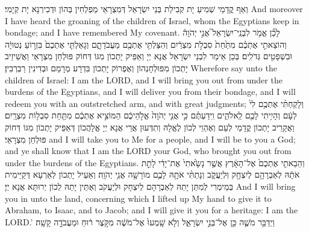 {{וְאַף קֳדָמַי שְׁמִיעַ יָת קְבִילַת בְּנֵי יִשְׂרָאֵל דְּמִצְרָאֵי מַפְלְחִין בְּהוֹן וּדְכִירְנָא יָת קְיָמִי׃}
{And moreover I have heard the groaning of the children of Israel, whom the Egyptians keep in bondage; and I have remembered My covenant.}{}
{לָכֵ֞ן אֱמֹ֥ר לִבְנֵֽי־יִשְׂרָאֵל֮ אֲנִ֣י יְהֹוָה֒ וְהוֹצֵאתִ֣י אֶתְכֶ֗ם מִתַּ֙חַת֙ סִבְלֹ֣ת מִצְרַ֔יִם וְהִצַּלְתִּ֥י אֶתְכֶ֖ם מֵעֲבֹדָתָ֑ם וְגָאַלְתִּ֤י אֶתְכֶם֙ בִּזְר֣וֹעַ נְטוּיָ֔ה וּבִשְׁפָטִ֖ים גְּדֹלִֽים׃
}
{בְּכֵן אֵימַר לִבְנֵי יִשְׂרָאֵל אֲנָא יְיָ וְאַפֵּיק יָתְכוֹן מִגּוֹ דְּחוֹק פּוּלְחַן מִצְרָאֵי וַאֲשֵׁיזֵיב יָתְכוֹן מִפּוּלְחָנְהוֹן וְאֶפְרוֹק יָתְכוֹן בִּדְרָע מְרָמַם וּבְדִינִין רַבְרְבִין׃}
{Wherefore say unto the children of Israel: I am the LORD, and I will bring you out from under the burdens of the Egyptians, and I will deliver you from their bondage, and I will redeem you with an outstretched arm, and with great judgments;}{}
{וְלָקַחְתִּ֨י אֶתְכֶ֥ם לִי֙ לְעָ֔ם וְהָיִ֥יתִי לָכֶ֖ם לֵֽאלֹהִ֑ים וִֽידַעְתֶּ֗ם כִּ֣י אֲנִ֤י יְהֹוָה֙ אֱלֹ֣הֵיכֶ֔ם הַמּוֹצִ֣יא אֶתְכֶ֔ם מִתַּ֖חַת סִבְל֥וֹת מִצְרָֽיִם׃}
{וַאֲקָרֵיב יָתְכוֹן קֳדָמַי לְעַם וְאֶהְוֵי לְכוֹן לֶאֱלָהּ וְתִדְּעוּן אֲרֵי אֲנָא יְיָ אֱלָהֲכוֹן דְּאַפֵּיק יָתְכוֹן מִגּוֹ דְּחוֹק פּוּלְחַן מִצְרָאֵי׃}
{and I will take you to Me for a people, and I will be to you a God; and ye shall know that I am the LORD your God, who brought you out from under the burdens of the Egyptians.}{}
{וְהֵבֵאתִ֤י אֶתְכֶם֙ אֶל־הָאָ֔רֶץ אֲשֶׁ֤ר נָשָׂ֙אתִי֙ אֶת־יָדִ֔י לָתֵ֣ת אֹתָ֔הּ לְאַבְרָהָ֥ם לְיִצְחָ֖ק וּֽלְיַעֲקֹ֑ב וְנָתַתִּ֨י אֹתָ֥הּ לָכֶ֛ם מוֹרָשָׁ֖ה אֲנִ֥י יְהֹוָֽה׃
}
{וְאַעֵיל יָתְכוֹן לְאַרְעָא דְּקַיֵּימִית בְּמֵימְרִי לְמִתַּן יָתַהּ לְאַבְרָהָם לְיִצְחָק וּלְיַעֲקֹב וְאֶתֵּין יָתַהּ לְכוֹן יְרוּתָּא אֲנָא יְיָ׃}
{And I will bring you in unto the land, concerning which I lifted up My hand to give it to Abraham, to Isaac, and to Jacob; and I will give it you for a heritage: I am the LORD.’}{}
{וַיְדַבֵּ֥ר מֹשֶׁ֛ה כֵּ֖ן אֶל־בְּנֵ֣י יִשְׂרָאֵ֑ל וְלֹ֤א שָֽׁמְעוּ֙ אֶל־מֹשֶׁ֔ה מִקֹּ֣צֶר ר֔וּחַ וּמֵעֲבֹדָ֖ה קָשָֽׁה׃ \petucha 
}}
